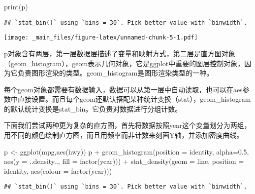 \documentclass[
]{book}
\newenvironment{Shaded}{\begin{snugshade}}{\end{snugshade}}
\newcommand{\AttributeTok}[1]{\textcolor[rgb]{0.77,0.63,0.00}{#1}}
\newcommand{\FloatTok}[1]{\textcolor[rgb]{0.00,0.00,0.81}{#1}}
\newcommand{\FunctionTok}[1]{\textcolor[rgb]{0.00,0.00,0.00}{#1}}
\newcommand{\NormalTok}[1]{#1}
\newcommand{\OtherTok}[1]{\textcolor[rgb]{0.56,0.35,0.01}{#1}}
\newcommand{\SpecialCharTok}[1]{\textcolor[rgb]{0.00,0.00,0.00}{#1}}
\newcommand{\StringTok}[1]{\textcolor[rgb]{0.31,0.60,0.02}{#1}}
\begin{document}
\begin{Shaded}
\begin{Highlighting}[]
\FunctionTok{print}\NormalTok{(p)}
\end{Highlighting}
\end{Shaded}

\begin{verbatim}
## `stat_bin()` using `bins = 30`. Pick better value with `binwidth`.
\end{verbatim}

\texttt{[image: \_main\_files/figure-latex/unnamed-chunk-5-1.pdf]}

p对象含有两层，第一层数据层描述了变量和映射方式，第二层是直方图对象（geom\_histogram），geom表示几何对象，它是ggplot中重要的图层控制对象，因为它负责图形渲染的类型。geom\_histogram是图形渲染类型的一种。

每个geom对象都需要有数据输入，数据可以从第一层中自动读取，也可以在aes参数中直接设置。而且每个geom还默认搭配某种统计变换（stat），geom\_histogram的默认统计变换是stat\_bin。它负责对数据进行分组计数。

下面我们尝试两种更为复杂的直方图，首先将数据按照year这个变量划分为两组，用不同的颜色绘制直方图，而且用频率而非计数来刻画Y轴，并添加密度曲线。

\begin{Shaded}
\begin{Highlighting}[]
\NormalTok{p }\OtherTok{\textless{}{-}} \FunctionTok{ggplot}\NormalTok{(mpg,}\FunctionTok{aes}\NormalTok{(hwy))}
\NormalTok{p }\SpecialCharTok{+} \FunctionTok{geom\_histogram}\NormalTok{(}\AttributeTok{position =} \StringTok{\textquotesingle{}identity\textquotesingle{}}\NormalTok{,}
\AttributeTok{alpha=}\FloatTok{0.5}\NormalTok{,}
\FunctionTok{aes}\NormalTok{(}\AttributeTok{y =}\NormalTok{ ..density..,}
\AttributeTok{fill =} \FunctionTok{factor}\NormalTok{(year))) }\SpecialCharTok{+}
\FunctionTok{stat\_density}\NormalTok{(}\AttributeTok{geom =} \StringTok{\textquotesingle{}line\textquotesingle{}}\NormalTok{,}
\AttributeTok{position =} \StringTok{\textquotesingle{}identity\textquotesingle{}}\NormalTok{,}
\FunctionTok{aes}\NormalTok{(}\AttributeTok{colour =} \FunctionTok{factor}\NormalTok{(year)))}
\end{Highlighting}
\end{Shaded}

\begin{verbatim}
## `stat_bin()` using `bins = 30`. Pick better value with `binwidth`.
\end{verbatim}
\end{document}
